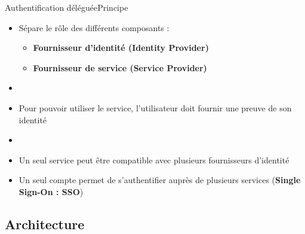 \documentclass{beamer}
\begin{document}
\begin{frame}{Authentification déléguée}{Principe}
  \begin{center}
    \begin{itemize}
      \item Sépare le rôle des différents composants :
      \begin{itemize}
        \item \textbf{Fournisseur d'identité (Identity Provider)}
        \item \textbf{Fournisseur de service (Service Provider)}
      \end{itemize}
      \item[~]
      \item Pour pouvoir utiliser le service, l'utilisateur doit fournir une preuve de son identité
      \item[~]
      \item Un seul service peut être compatible avec plusieurs fournisseurs d'identité
      \item Un seul compte permet de s'authentifier auprès de plusieurs services (\textbf{Single Sign-On : SSO})
    \end{itemize}
  \end{center}
\end{frame}

\subsection{Architecture}
\end{document}
